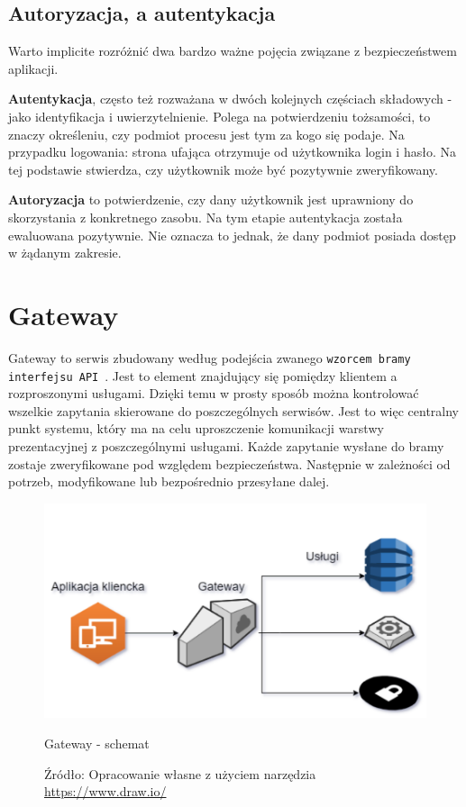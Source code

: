 \subsection{Autoryzacja, a autentykacja}

Warto implicite rozróżnić dwa bardzo ważne pojęcia związane z bezpieczeństwem aplikacji.

\textbf{Autentykacja}, często też rozważana w dwóch kolejnych częściach składowych - jako identyfikacja i uwierzytelnienie. Polega na potwierdzeniu tożsamości, to znaczy określeniu, czy podmiot procesu jest tym za kogo się podaje. Na przypadku logowania: strona ufająca otrzymuje od użytkownika login i hasło. Na tej podstawie stwierdza, czy użytkownik może być pozytywnie zweryfikowany.

\textbf{Autoryzacja} to potwierdzenie, czy dany użytkownik jest uprawniony do skorzystania z konkretnego zasobu. Na tym etapie autentykacja została ewaluowana pozytywnie. Nie oznacza to jednak, że dany podmiot posiada dostęp w żądanym zakresie. 

\section{Gateway}
Gateway to serwis zbudowany według podejścia zwanego \texttt{wzorcem bramy interfejsu API}~\cite{richardson2018api}. Jest to element znajdujący się pomiędzy klientem a rozproszonymi usługami. Dzięki temu w prosty sposób można kontrolować wszelkie zapytania skierowane do poszczególnych serwisów.
Jest to więc centralny punkt systemu, który ma na celu uproszczenie komunikacji warstwy prezentacyjnej z poszczególnymi usługami. Każde zapytanie wysłane do bramy zostaje zweryfikowane pod względem bezpieczeństwa. Następnie w zależności od potrzeb, modyfikowane lub bezpośrednio przesyłane dalej.
\begin{figure}[H]
	\centering
	\includegraphics[width=\linewidth]{gateway.pdf}
	\caption{\centering Gateway - schemat}
	\caption*{\centering Źródło: {Opracowanie własne z użyciem narzędzia \url{https://www.draw.io/}}}
\end{figure}

